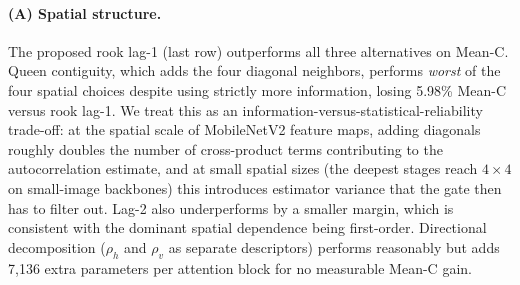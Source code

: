 \documentclass{bmvc2k}
\begin{document}
\begin{table}[h]
\centering
\caption{Ablation on the MobileNetV2-GTSRB combination. Spatial group fixes descriptor $=[\mu,\sigma,\phi]$; descriptor group fixes spatial mode = rook lag-1. The pivot configuration (LACE) combines rook lag-1 with $[\mu,\sigma,\phi]$ and is shown in the last row.}
\label{tab:ablation}
\renewcommand{\arraystretch}{0.70}
\end{table}

\paragraph{(A) Spatial structure.} The proposed rook lag-1 (last row) outperforms all three alternatives on Mean-C. Queen contiguity, which adds the four diagonal neighbors, performs \emph{worst} of the four spatial choices despite using strictly more information, losing 5.98\% Mean-C versus rook lag-1. We treat this as an information-versus-statistical-reliability trade-off: at the spatial scale of MobileNetV2 feature maps, adding diagonals roughly doubles the number of cross-product terms contributing to the autocorrelation estimate, and at small spatial sizes (the deepest stages reach $4\times4$ on small-image backbones) this introduces estimator variance that the gate then has to filter out. Lag-2 also underperforms by a smaller margin, which is consistent with the dominant spatial dependence being first-order. Directional decomposition ($\rho_h$ and $\rho_v$ as separate descriptors) performs reasonably but adds 7{,}136 extra parameters per attention block for no measurable Mean-C gain.
\end{document}
